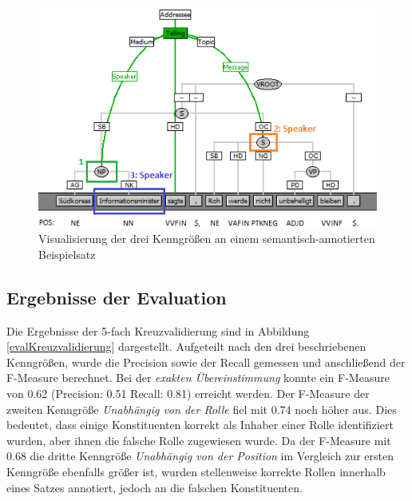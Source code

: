 \documentclass[12pt]{article}
\begin{document}
	\begin{figure}[tb!]
		\centering
		\includegraphics{images/evaluation_kenngroeszen.png}
		\caption[Visualisierung der Kenngrößen]{Visualisierung der drei Kenngrößen an einem semantisch-annotierten Beispielsatz}
		\label{evalKenngroeszen}
	\end{figure}


\subsection{Ergebnisse der Evaluation}

Die Ergebnisse der 5-fach Kreuzvalidierung sind in Abbildung \ref{evalKreuzvalidierung} dargestellt. Aufgeteilt nach den drei beschriebenen Kenngrößen, wurde die Precision sowie der Recall gemessen und anschließend der F-Measure berechnet. Bei der \textit{exakten Übereinstimmung} konnte ein F-Measure von 0.62 (Precision: 0.51 Recall: 0.81) erreicht werden. Der F-Measure der zweiten Kenngröße \textit{Unabhängig von der Rolle} fiel mit 0.74 noch höher aus. Dies bedeutet, dass einige Konstituenten korrekt als Inhaber einer Rolle identifiziert wurden, aber ihnen die falsche Rolle zugewiesen wurde. Da der F-Measure mit 0.68 die dritte Kenngröße \textit{Unabhängig von der Position} im Vergleich zur ersten Kenngröße ebenfalls größer ist, wurden stellenweise korrekte Rollen innerhalb eines Satzes annotiert, jedoch an die falschen Konstituenten. 

\end{document}
